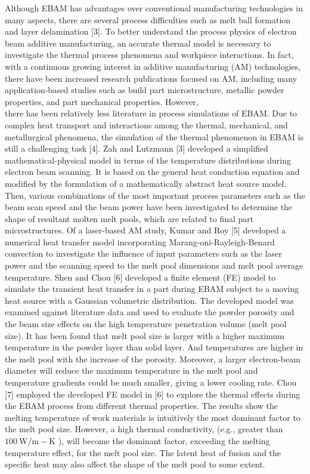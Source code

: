 \documentclass[10pt]{article}
\begin{document}
Although EBAM has advantages over conventional manufacturing technologies in many aspects, there are several process difficulties such as melt ball formation and layer delamination [3]. To better understand the process physics of electron beam additive manufacturing, an accurate thermal model is necessary to investigate the thermal process phenomena and workpiece interactions. In fact, with a continuous growing interest in additive manufacturing (AM) technologies, there have been increased research publications focused on AM, including many application-based studies such as build part microstructure, metallic powder properties, and part mechanical properties. However,\\
there has been relatively less literature in process simulations of EBAM. Due to complex heat transport and interactions among the thermal, mechanical, and metallurgical phenomena, the simulation of the thermal phenomenon in EBAM is still a challenging task [4]. Zah and Lutzmann [3] developed a simplified mathematical-physical model in terms of the temperature distributions during electron beam scanning. It is based on the general heat conduction equation and modified by the formulation of a mathematically abstract heat source model. Then, various combinations of the most important process parameters such as the beam scan speed and the beam power have been investigated to determine the shape of resultant molten melt pools, which are related to final part microstructures. Of a laser-based AM study, Kumar and Roy [5] developed a numerical heat transfer model incorporating Marang-oni-Rayleigh-Benard convection to investigate the influence of input parameters such as the laser power and the scanning speed to the melt pool dimensions and melt pool average temperature. Shen and Chou [6] developed a finite element (FE) model to simulate the transient heat transfer in a part during EBAM subject to a moving heat source with a Gaussian volumetric distribution. The developed model was examined against literature data and used to evaluate the powder porosity and the beam size effects on the high temperature penetration volume (melt pool size). It has been found that melt pool size is larger with a higher maximum temperature in the powder layer than solid layer. And temperatures are higher in the melt pool with the increase of the porosity. Moreover, a larger electron-beam diameter will reduce the maximum temperature in the melt pool and temperature gradients could be much smaller, giving a lower cooling rate. Chou [7] employed the developed FE model in [6] to explore the thermal effects during the EBAM process from different thermal properties. The results show the melting temperature of work materials is intuitively the most dominant factor to the melt pool size. However, a high thermal conductivity, (e.g., greater than $100 \mathrm{~W} / \mathrm{m}-\mathrm{K}$ ), will become the dominant factor, exceeding the melting temperature effect, for the melt pool size. The latent heat of fusion and the specific heat may also affect the shape of the melt pool to some extent.
\end{document}

